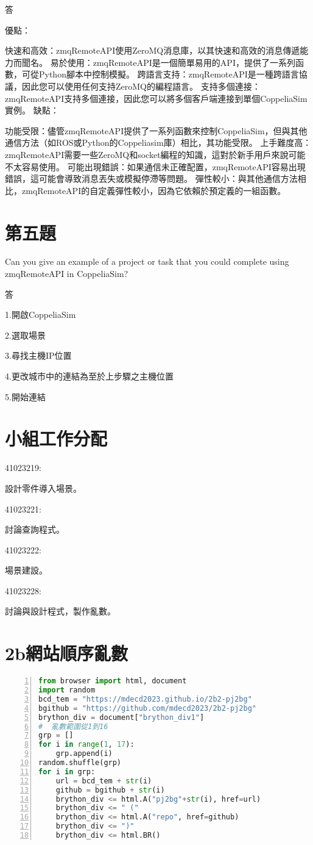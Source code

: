 答

優點：

快速和高效：zmqRemoteAPI使用ZeroMQ消息庫，以其快速和高效的消息傳遞能力而聞名。
易於使用：zmqRemoteAPI是一個簡單易用的API，提供了一系列函數，可從Python腳本中控制模擬。
跨語言支持：zmqRemoteAPI是一種跨語言協議，因此您可以使用任何支持ZeroMQ的編程語言。
支持多個連接：zmqRemoteAPI支持多個連接，因此您可以將多個客戶端連接到單個CoppeliaSim實例。
缺點：

功能受限：儘管zmqRemoteAPI提供了一系列函數來控制CoppeliaSim，但與其他通信方法（如ROS或Python的Coppeliasim庫）相比，其功能受限。
上手難度高：zmqRemoteAPI需要一些ZeroMQ和socket編程的知識，這對於新手用戶來說可能不太容易使用。
可能出現錯誤：如果通信未正確配置，zmqRemoteAPI容易出現錯誤，這可能會導致消息丟失或模擬停滯等問題。
彈性較小：與其他通信方法相比，zmqRemoteAPI的自定義彈性較小，因為它依賴於預定義的一組函數。

\section{第五題}
Can you give an example of a project or task that you could complete using zmqRemoteAPI in CoppeliaSim?

答

1.開啟CoppeliaSim

2.選取場景

3.尋找主機IP位置

4.更改城市中的連結為至於上步驟之主機位置

5.開始連結


\section{小組工作分配}
41023219: 

設計零件導入場景。

41023221: 

討論查詢程式。

41023222: 

場景建設。

41023228: 

討論與設計程式，製作亂數。
\section{2b網站順序亂數}
\begin{lstlisting}[language=Python, frame=single, numbers=left, captionpos=b, basicstyle=\ttfamily\small, showstringspaces=false, breaklines=true, tabsize=4, xleftmargin=15pt]
from browser import html, document
import random
bcd_tem = "https://mdecd2023.github.io/2b2-pj2bg"
bgithub = "https://github.com/mdecd2023/2b2-pj2bg"
brython_div = document["brython_div1"]
#  亂數範圍從1到16
grp = []
for i in range(1, 17):
    grp.append(i)
random.shuffle(grp)
for i in grp:
    url = bcd_tem + str(i)
    github = bgithub + str(i)
    brython_div <= html.A("pj2bg"+str(i), href=url)
    brython_div <= " ("
    brython_div <= html.A("repo", href=github)
    brython_div <= ")"
    brython_div <= html.BR()
\end{lstlisting}